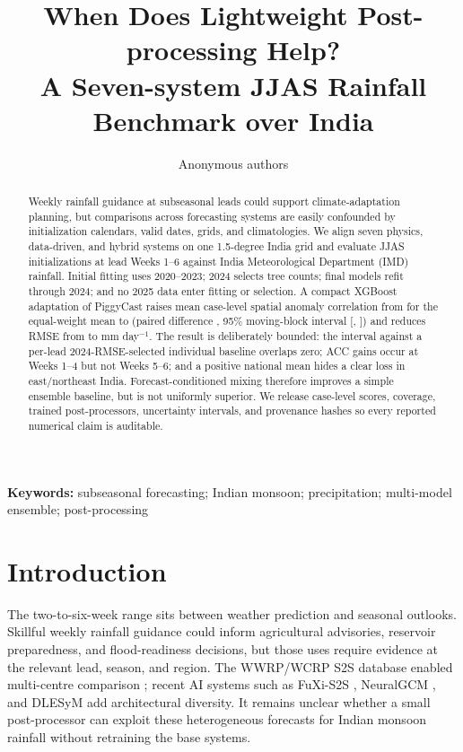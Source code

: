 \documentclass[10pt,twocolumn]{article}
\title{When Does Lightweight Post-processing Help?\\
A Seven-system JJAS Rainfall Benchmark over India}
\author{Anonymous authors}
\date{}
\begin{document}
\raggedbottom
\maketitle

\begin{abstract}
Weekly rainfall guidance at subseasonal leads could support climate-adaptation
planning, but comparisons across forecasting systems are easily confounded by
initialization calendars, valid dates, grids, and climatologies. We align seven
physics, data-driven, and hybrid systems on one 1.5-degree India grid and
evaluate JJAS initializations at lead Weeks 1--6 against India Meteorological
Department (IMD) rainfall. Initial fitting uses 2020--2023; 2024 selects tree
counts; final models refit through 2024; and no 2025 data enter fitting or
selection. A compact
XGBoost adaptation of PiggyCast raises mean case-level spatial anomaly
correlation from \EqualACC{} for the equal-weight mean to \FullACC{}
(paired difference \FullEqualEffect{}, 95\% moving-block interval
[\FullEqualLow{}, \FullEqualHigh{}]) and reduces RMSE from \EqualRMSE{} to
\FullRMSE{} mm day$^{-1}$. The result is deliberately bounded:
the interval against a per-lead 2024-RMSE-selected individual baseline
overlaps zero; ACC gains occur at Weeks 1--4 but not Weeks 5--6; and a
positive national mean hides a clear loss in east/northeast India.
Forecast-conditioned mixing therefore improves a simple ensemble baseline,
but is not uniformly superior. We release case-level scores, coverage,
trained post-processors, uncertainty intervals, and provenance hashes so every
reported numerical claim is auditable.
\end{abstract}

\noindent\textbf{Keywords:} subseasonal forecasting; Indian monsoon;
precipitation; multi-model ensemble; post-processing

\section{Introduction}

The two-to-six-week range sits between weather prediction and seasonal
outlooks. Skillful weekly rainfall guidance could inform agricultural
advisories, reservoir preparedness, and flood-readiness decisions, but those
uses require evidence at the relevant lead, season, and region. The
WWRP/WCRP S2S database enabled multi-centre comparison
\citep{vitart2017s2s}; recent AI systems such as FuXi-S2S
\citep{chen2024fuxi}, NeuralGCM \citep{kochkov2024neuralgcm}, and DLESyM
\citep{cresswellclay2024dlesym} add architectural diversity. It remains
unclear whether a small post-processor can exploit these heterogeneous
forecasts for Indian monsoon rainfall without retraining the base systems.
\end{document}
